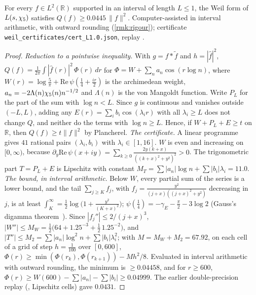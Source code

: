 \begin{theorem}[Positivity up to $L=1$, through the Frobenius at $2$]\label{thm:second-window}
For every $f\in L^2(\mathbb{R})$ supported in an interval of length $L\le1$,
the Weil form of $L(s,\chi_5)$ satisfies $Q(f)\ge0.0445\,\|f\|^2$.  Computer-assisted in interval arithmetic, with outward rounding (\cref{rmk:rigour}); certificate \texttt{weil\_certificates/cert\_L1.0.json}, replay .
\end{theorem}

\begin{proof}
\emph{Reduction to a pointwise inequality.}  With $g=f*\tilde f$ and
$h=|\hat f|^2$, $Q(f)=\frac1{2\pi}\int|\hat f(r)|^2\,\Phi(r)\,dr$ for
$\Phi=W+\sum_n a_n\cos(r\log n)$, where $W(r)=\log\frac5\pi+\mathrm{Re}\,\psi(\frac14+\frac{ir}2)$ is the archimedean
weight, $a_n=-2\Lambda(n)\chi_5(n)n^{-1/2}$ and $\Lambda(n)$ is the von Mangoldt function.  Write $P_L$ for the part of
the sum with $\log n<L$.  Since
$g$ is continuous and vanishes outside $(-L,L)$, adding any
$E(r)=\sum_i b_i\cos(\lambda_i r)$ with all $\lambda_i\ge L$ does not change
$Q$, and neither do the terms with $\log n\ge L$.  Hence, if
$W+P_L+E\ge t$ on $\mathbb{R}$, then $Q(f)\ge t\|f\|^2$ by Plancherel.
\emph{The certificate.}  A linear programme gives $41$ rational pairs
$(\lambda_i,b_i)$ with $\lambda_i\in[1,16]$.  $W$
is even and increasing on $[0,\infty)$, because
$\partial_y\mathrm{Re}\,\psi(x+iy)=\sum_{k\ge0}\frac{2y(k+x)}{((k+x)^2+y^2)^2}>0$.  The
trigonometric part $T=P_L+E$ is Lipschitz with constant
$M_T=\sum|a_n|\log n+\sum|b_i|\lambda_i=11.0$.  \emph{The bound, in interval arithmetic.}  Below $W$, every partial sum of the series is a lower bound, and the tail
$\sum_{j\ge K}f_j$, with $f_j=\frac{y^2}{(j+x)((j+x)^2+y^2)}$ decreasing in $j$, is at least $\int_K^\infty=\frac12\log\bigl(1+\frac{y^2}{(K+x)^2}\bigr)$;
$\psi(\tfrac14)=-\gamma_E-\frac\pi2-3\log2$ (Gauss's digamma theorem~\cite{dlmf}).  Since $|f_j''|\le2/(j+x)^3$, $|W''|\le M_W=\tfrac12\bigl(64+1.25^{-3}+\tfrac12\,1.25^{-2}\bigr)$, and
$|T''|\le M_2=\sum|a_n|\log^2n+\sum|b_i|\lambda_i^2$; with $M=M_W+M_2=67.92$, on each cell of a grid of step
$h=\tfrac1{100}$ over $[0,600]$, $\Phi(r)\ge\min(\Phi(r_k),\Phi(r_{k+1}))-Mh^2/8$.  Evaluated in interval arithmetic with
outward rounding, the minimum is $\ge0.04458$, and for $r\ge600$, $\Phi(r)\ge W(600)-\sum|a_n|-\sum|b_i|\ge0.04999$.
The earlier double-precision replay (, Lipschitz cells) gave $0.0431$.
\end{proof}

